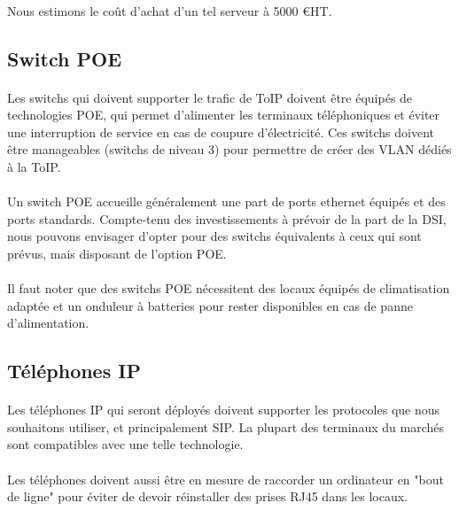 \paragraph{} Nous estimons le coût d'achat d'un tel serveur à 5000 \euro HT.

\subsection{Switch POE}

\paragraph{} Les switchs qui doivent supporter le trafic de ToIP doivent être
équipés de technologies \ac{POE}, qui permet d'alimenter les terminaux
téléphoniques et éviter une interruption de service en cas de coupure
d'électricité. Ces switchs doivent être manageables (switchs de niveau 3) pour
permettre de créer des VLAN dédiés à la ToIP.

\paragraph{} Un switch POE accueille généralement une part de ports ethernet
équipés et des ports standards. Compte-tenu des investissements à prévoir de la
part de la DSI, nous pouvons envisager d'opter pour des switchs équivalents à
ceux qui sont prévus, mais disposant de l'option POE.

\paragraph{} Il faut noter que des switchs POE nécessitent des locaux équipés de
climatisation adaptée et un onduleur à batteries pour rester disponibles en cas
de panne d'alimentation.

\subsection{Téléphones IP}

\paragraph{} Les téléphones IP qui seront déployés doivent supporter les
protocoles que nous souhaitons utiliser, et principalement \ac{SIP}. La plupart
des terminaux du marchés sont compatibles avec une telle technologie.

\paragraph{} Les téléphones doivent aussi être en mesure de raccorder un
ordinateur en "bout de ligne" pour éviter de devoir réinstaller des prises RJ45
dans les locaux.
